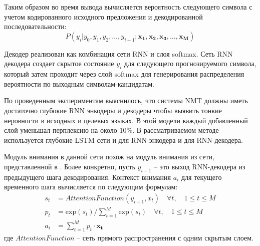 \documentclass[12pt, a4paper]{article}
\begin{document}
        Таким образом во время вывода вычисляется вероятность следующего символа с учетом кодированного исходного предложения и декодированной последовательности:
        \begin{equation}
            P(y_i|y_0, y_1, y_2, \dots, y_{i-1};\mathbf{x_1, x_2, x_3, \dots, x_M})
        \end{equation}

        Декодер реализован как комбинация сети RNN и слоя softmax. Сеть RNN декодера создает скрытое состояние $y_i$ для следующего прогнозируемого символа, который затем проходит через слой softmax для генерирования распределения вероятности по выходным символам-кандидатам.

        По проведенным экспериментам выяснилось, что системы NMT должны иметь достаточно глубокие RNN энкодеры и декодеры чтобы выявить тонкие неровности в исходных и целевых языках. В этой модели каждый добавленный слой уменьшал перплексию на около 10\%. В рассматриваемом методе используется глубокие LSTM сети и для RNN-энкодера и для RNN-декодера.

        Модуль внимания в данной сети похож на модуль внимания из сети, представленной в \cite{nmt}. Более конкретно, пусть $y_{i-1}$ -- это выход RNN-декодера из предыдущего шага декодирования. Контекст внимания $a_i$ для текущего временного шага вычисляется по следующим формулам:
        \begin{equation}
        \begin{aligned}
            s_t &= \textit{AttentionFunction}(y_{i-1}, x_t) \quad \forall t, \quad 1 \leq t \leq M \\
            p_t &= \text{exp}(s_t) / \sum_{t=1}^{M} \text{exp}(s_t) \quad \forall t, \quad 1 \leq t \leq M \\
            a_i &= \sum_{t=1}^{M}p_t \cdot \mathbf{x_t}
        \end{aligned}
        \end{equation}
        где $AttentionFunction$ -- сеть прямого распространения с одним скрытым слоем.
\end{document}
